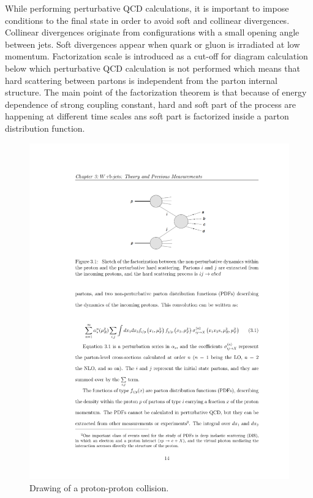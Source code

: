 While performing perturbative QCD calculations, it is important to impose conditions to the final state in order to avoid soft and collinear divergences. Collinear divergences originate from configurations with a small opening angle between jets. Soft divergences appear when quark or gluon is irradiated at low momentum. Factorization scale is introduced as a cut-off for diagram calculation below which perturbative QCD calculation is not performed which means that hard scattering between partons is independent from the parton internal structure. The main point of the factorization theorem  is that because of energy dependence of strong coupling constant, hard and soft part of the process are happening at different time scales ans soft part is factorized inside a parton distribution function.
\begin{figure}[htbp]
	\centering
		\includegraphics{Figures/diagram.pdf}
	\caption[Drawing of a proton-proton collision]{Drawing of a proton-proton collision.}
	\label{fig:pp_drawing}
\end{figure}
